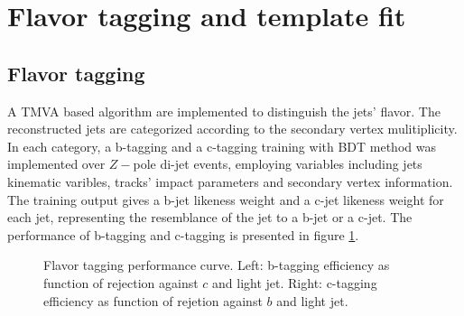 \section{Flavor tagging and template fit}\label{sec:templatefit}
\subsection{Flavor tagging}\label{subsec:flavortagging}
 A TMVA based algorithm are implemented to distinguish the jets' flavor. 
 The reconstructed jets are categorized according to the secondary vertex mulitiplicity. 
 In each category, a b-tagging and a c-tagging training with BDT method was implemented over $Z-$pole di-jet events, employing variables including jets kinematic varibles, tracks' impact parameters and secondary vertex information. The training output gives a b-jet likeness weight and a c-jet likeness weight for each jet, representing the resemblance of the jet to a b-jet or a c-jet. The performance of b-tagging and c-tagging is presented in figure \ref{fig:FT_performance}. 
\begin{figure}[!htpb]
\label{fig:FT_performance}
\centering
{}
\caption{Flavor tagging performance curve. Left: b-tagging efficiency as function of rejection against $c$ and light jet. Right: c-tagging efficiency as function of rejetion against $b$ and light jet.}
\end{figure}

 
